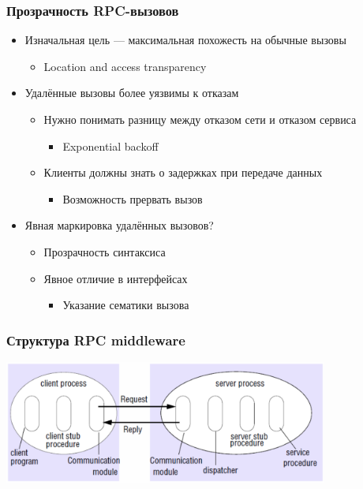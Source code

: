 \documentclass[xetex,mathserif,serif]{beamer}
\begin{document}
	\begin{frame}
		\frametitle{Прозрачность RPC-вызовов}
		\begin{itemize}
			\item Изначальная цель --- максимальная похожесть на обычные вызовы
			\begin{itemize}
				\item Location and access transparency
			\end{itemize}
			\item Удалённые вызовы более уязвимы к отказам
			\begin{itemize}
				\item Нужно понимать разницу между отказом сети и отказом сервиса
				\begin{itemize}
					\item Exponential backoff
				\end{itemize}
				\item Клиенты должны знать о задержках при передаче данных
				\begin{itemize}
					\item Возможность прервать вызов
				\end{itemize}
			\end{itemize}
			\item Явная маркировка удалённых вызовов?
			\begin{itemize}
				\item Прозрачность синтаксиса
				\item Явное отличие в интерфейсах
				\begin{itemize}
					\item Указание сематики вызова
				\end{itemize}
			\end{itemize}
		\end{itemize}
	\end{frame}

	\begin{frame}
		\frametitle{Структура RPC middleware}
		\begin{center}
			\includegraphics[width=0.8\textwidth]{rpcMiddlewareArchitecture.png}
		\end{center}
	\end{frame}
\end{document}
